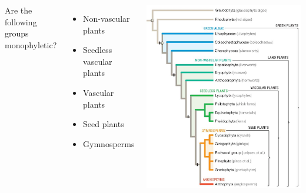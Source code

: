 \begin{frame}
    \begin{adjustwidth}{-2em}{-1.5em}
        \begin{columns}

            Are the following groups monophyletic?

            \begin{itemize}
                \item Non-vascular plants


                \item Seedless vascular plants


                \item Vascular plants


                \item Seed plants


                \item Gymnosperms

            \end{itemize}


            \includegraphics[height=\textheight]{plant-phylogeny.png}

        \end{columns}
    \end{adjustwidth}
\end{frame}

